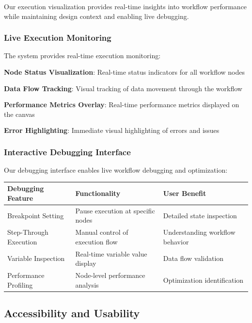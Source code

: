 Our execution visualization provides real-time insights into workflow performance while maintaining design context and enabling live debugging.

\subsubsection*{Live Execution Monitoring}

The system provides real-time execution monitoring:

\begin{expandedlist}
    \item \textbf{Node Status Visualization}: Real-time status indicators for all workflow nodes
    \item \textbf{Data Flow Tracking}: Visual tracking of data movement through the workflow
    \item \textbf{Performance Metrics Overlay}: Real-time performance metrics displayed on the canvas
    \item \textbf{Error Highlighting}: Immediate visual highlighting of errors and issues
\end{expandedlist}

\subsubsection*{Interactive Debugging Interface}

Our debugging interface enables live workflow debugging and optimization:

\begin{center}
\begin{tabular}{@{}lll@{}}
\toprule
\textbf{Debugging Feature} & \textbf{Functionality} & \textbf{User Benefit} \\
\midrule
Breakpoint Setting & Pause execution at specific nodes & Detailed state inspection \\
Step-Through Execution & Manual control of execution flow & Understanding workflow behavior \\
Variable Inspection & Real-time variable value display & Data flow validation \\
Performance Profiling & Node-level performance analysis & Optimization identification \\
\bottomrule
\end{tabular}
\end{center}

\subsection*{Accessibility and Usability}

